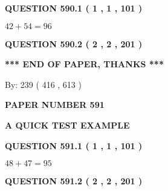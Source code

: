 \documentclass[12pt]{article}
\begin{document}
{\textbf{\Large{QUESTION
590.1 
 ( 1 , 1 , 101 )
}}}
  
  
 
 

$ %
42 +  %
54=   %
96$
 
 
  
\vspace{0.2in}
  
{\textbf{\Large{QUESTION
590.2 
 ( 2 , 2 , 201 )
}}}
  
  
   
   
 \vspace{0.2in}
 
   
   
   
   
\vspace{1.0in} 
{\textbf{\large{ *** END OF PAPER, THANKS *** }}} 
   
   
\hspace{1.0in} By: 
 239 ( 416 ,  613 )
   
   
   
   
\newpage 
\setcounter{page}{ 
   591001 } 
   
   
   
   
 {\textbf{ \Large{ PAPER NUMBER  591  }}}
   
   
\vspace{0.2in}
   
   
   
   
   
   
 \vspace{0.2in}
{\LARGE {\textbf{ A QUICK TEST EXAMPLE}}}
   
   
  
\vspace{0.2in}
  
{\textbf{\Large{QUESTION
591.1 
 ( 1 , 1 , 101 )
}}}
  
  
 
 

$ %
48 +  %
47=   %
95$
 
 
  
\vspace{0.2in}
  
{\textbf{\Large{QUESTION
591.2 
 ( 2 , 2 , 201 )
}}}
  
  
   
   
 \vspace{0.2in}
 
   
   
\end{document}
